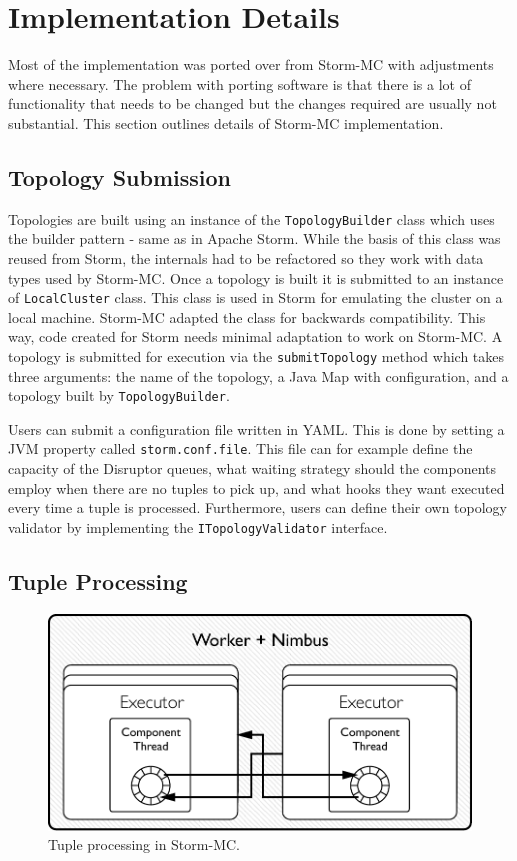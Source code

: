 \section{Implementation Details}
\label{sec:implementation}

Most of the implementation was ported over from Storm-MC with adjustments where necessary. The problem with porting software is that there is a lot of functionality that needs to be changed but the changes required are usually not substantial. This section outlines details of Storm-MC implementation.

\subsection{Topology Submission}

Topologies are built using an instance of the \texttt{TopologyBuilder} class which uses the builder pattern - same as in Apache Storm. While the basis  of this class was reused from Storm, the internals had to be refactored so they work with data types used by Storm-MC. Once a topology is built it is submitted to an instance of \texttt{LocalCluster} class. This class is used in Storm for emulating the cluster on a local machine. Storm-MC adapted the class for backwards compatibility. This way, code created for Storm needs minimal adaptation to work on Storm-MC. A topology is submitted for execution via the \texttt{submitTopology} method which takes three arguments: the name of the topology, a Java Map with configuration, and a topology built by \texttt{TopologyBuilder}.

Users can submit a configuration file written in YAML. This is done by setting a JVM property called \texttt{storm.conf.file}. This file can for example define the capacity of the Disruptor queues, what waiting strategy should the components employ when there are no tuples to pick up, and what hooks they want executed every time a tuple is processed. Furthermore, users can define their own topology validator by implementing the \texttt{ITopologyValidator} interface.

\subsection{Tuple Processing}

\begin{figure}[!htb]
	\centering
	\includegraphics[scale=0.7]{pdf/worker_inside_mc.pdf}
	\caption{Tuple processing in Storm-MC.}
	\label{fig:worker_inside_mc}
\end{figure}

